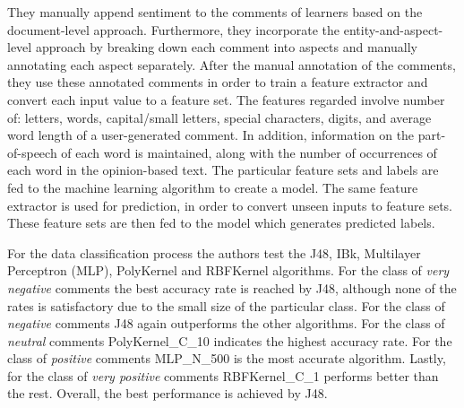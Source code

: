 They manually append sentiment to the comments of learners
based on the document-level approach.
Furthermore, they incorporate the entity-and-aspect-level approach
by breaking down each comment into aspects and manually annotating each aspect separately.
After the manual annotation of the comments,
they use these annotated comments in order to train a feature extractor
and convert each input value to a feature set.
The features regarded involve number of: letters, words, capital/small letters,
special characters, digits, and average word length of a user-generated comment.
In addition, information on the part-of-speech of each word is maintained,
along with the number of occurrences of each word in the opinion-based text.
The particular feature sets and labels are fed to the machine learning algorithm
to create a model.
The same feature extractor is used for prediction,
in order to convert unseen inputs to feature sets.
These feature sets are then fed to the model which generates predicted labels.

For the data classification process
the authors test the J48, IBk, Multilayer Perceptron (MLP),
PolyKernel and RBFKernel algorithms.
For the class of \emph{very negative} comments
the best accuracy rate is reached by J48,
although none of the rates is satisfactory
due to the small size of the particular class.
For the class of \emph{negative} comments J48 again outperforms the other algorithms.
For the class of \emph{neutral} comments
PolyKernel\_C\_10 indicates the highest accuracy rate.
For the class of \emph{positive} comments MLP\_N\_500 is the most accurate algorithm.
Lastly, for the class of \emph{very positive} comments RBFKernel\_C\_1 performs better than the rest.
Overall, the best performance is achieved by J48.


